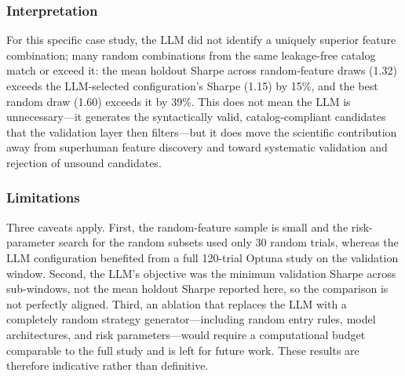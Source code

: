 \documentclass[analytics,article,submit,pdftex,moreauthors]{Definitions/mdpi}
\begin{document}
\subsubsection{Interpretation}

For this specific case study, the LLM did not identify a uniquely superior feature combination; many random combinations from the same leakage-free catalog match or exceed it: the mean holdout Sharpe across random-feature draws (1.32) exceeds the LLM-selected configuration's Sharpe (1.15) by 15\%, and the best random draw (1.60) exceeds it by 39\%. This does not mean the LLM is unnecessary---it generates the syntactically valid, catalog-compliant candidates that the validation layer then filters---but it does move the scientific contribution away from superhuman feature discovery and toward systematic validation and rejection of unsound candidates.

\subsubsection{Limitations}

Three caveats apply. First, the random-feature sample is small and the risk-parameter search for the random subsets used only 30 random trials, whereas the LLM configuration benefited from a full 120-trial Optuna study on the validation window. Second, the LLM's objective was the minimum validation Sharpe across sub-windows, not the mean holdout Sharpe reported here, so the comparison is not perfectly aligned. Third, an ablation that replaces the LLM with a completely random strategy generator---including random entry rules, model architectures, and risk parameters---would require a computational budget comparable to the full study and is left for future work. These results are therefore indicative rather than definitive.
\end{document}
